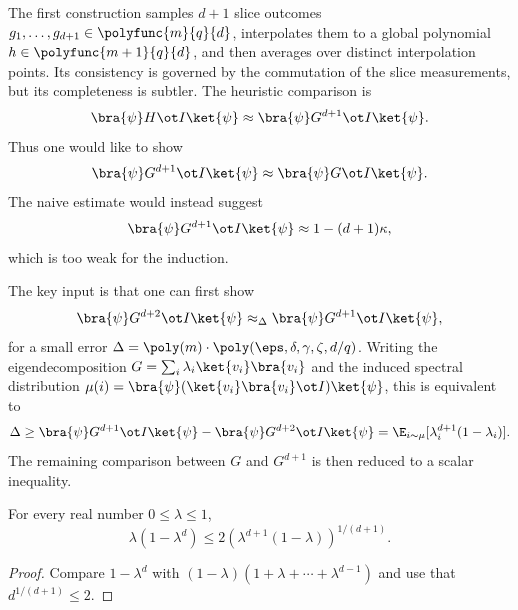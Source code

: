 The first construction samples $d+1$ slice outcomes $g_1,\dots,g_{d+1}\in \polyfunc{m}{q}{d}$, interpolates them to a global polynomial $h \in \polyfunc{m+1}{q}{d}$, and then averages over distinct interpolation points. Its consistency is governed by the commutation of the slice measurements, but its completeness is subtler. The heuristic comparison is
\[
	\bra{\psi} H \ot I \ket{\psi} \approx \bra{\psi} G^{d+1} \ot I \ket{\psi}.
\]
Thus one would like to show
\begin{equation}\label{eq:first-construction-g-power-comparison}
	\bra{\psi} G^{d+1} \ot I \ket{\psi}
	\approx \bra{\psi} G \ot I \ket{\psi}.
\end{equation}
The naive estimate would instead suggest
\begin{equation}\label{eq:first-construction-naive-bound}
	\bra{\psi} G^{d+1} \ot I \ket{\psi} \approx 1-(d+1)\kappa,
\end{equation}
which is too weak for the induction.

The key input is that one can first show
\begin{equation}\label{eq:first-construction-power-increment}
	\bra{\psi} G^{d+2} \ot I \ket{\psi}
	\approx_\Delta \bra{\psi} G^{d+1} \ot I \ket{\psi},
\end{equation}
for a small error $\Delta = \poly(m)\cdot \poly(\eps,\delta,\gamma,\zeta,d/q)$. Writing the eigendecomposition $G=\sum_i \lambda_i \ket{v_i}\bra{v_i}$ and the induced spectral distribution $\mu(i)=\bra{\psi}(\ket{v_i}\bra{v_i}\ot I)\ket{\psi}$, this is equivalent to
\begin{equation}\label{eq:first-construction-spectral-defect}
	\Delta
	\ge \bra{\psi} G^{d+1} \ot I \ket{\psi} - \bra{\psi} G^{d+2} \ot I \ket{\psi}
	= \E_{i\sim\mu}[\lambda_i^{d+1}(1-\lambda_i)].
\end{equation}
The remaining comparison between $G$ and $G^{d+1}$ is then reduced to a scalar inequality.

\begin{lemma}\label{lem:looks-easy-but-took-me-a-while}
	\leanok
	For every real number $0 \le \lambda \le 1$,
	\[
		\lambda(1-\lambda^d) \le 2(\lambda^{d+1}(1-\lambda))^{1/(d+1)}.
	\]
\end{lemma}
\begin{proof}
	\leanok
	Compare $1-\lambda^d$ with $(1-\lambda)(1+\lambda+\cdots+\lambda^{d-1})$ and use that $d^{1/(d+1)} \le 2$.
\end{proof}


